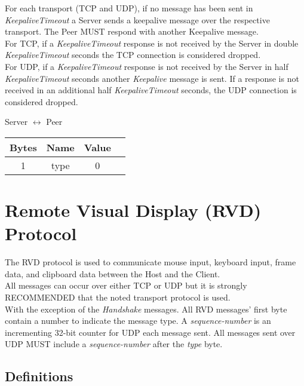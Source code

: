 \documentclass{article}
\begin{document}
    For each transport (TCP and UDP), if no message has been sent in \emph{KeepaliveTimeout} a Server sends a keepalive
    message over the respective transport. The Peer MUST respond with another Keepalive message.\\

    For TCP, if a \emph{KeepaliveTimeout} response is not received by the Server in
    double \emph{KeepaliveTimeout} seconds the TCP connection is considered dropped.\\

    For UDP, if a \emph{KeepaliveTimeout} response is not received by the Server in
    half  \emph{KeepaliveTimeout} seconds another \emph{Keepalive} message is sent. If a response is not received in
    an additional half \emph{KeepaliveTimeout} seconds, the UDP connection is considered dropped.

    \begin{center}
        Server $\leftrightarrow$ Peer\\
        \begin{tabular}{|c|c|c|c|}
            \hline
            \textbf{Bytes} & \textbf{Name} & \textbf{Value} \\
            \hline
            1              & type          & 0              \\
            \hline
        \end{tabular}
    \end{center}


    \section{Remote Visual Display (RVD) Protocol}

    The RVD protocol is used to communicate mouse input, keyboard input, frame data, and clipboard data between the
    Host and the Client.\\

    All messages can occur over either TCP or UDP but it is strongly RECOMMENDED that the noted transport protocol is
    used.\\

    With the exception of the \emph{Handshake} messages. All RVD messages' first byte contain a number to indicate
    the message type. A \emph{sequence-number} is an incrementing 32-bit counter for UDP each message sent. All
    messages sent over UDP MUST include a \emph{sequence-number} after the \emph{type} byte.

    \subsection{Definitions}
\end{document}
